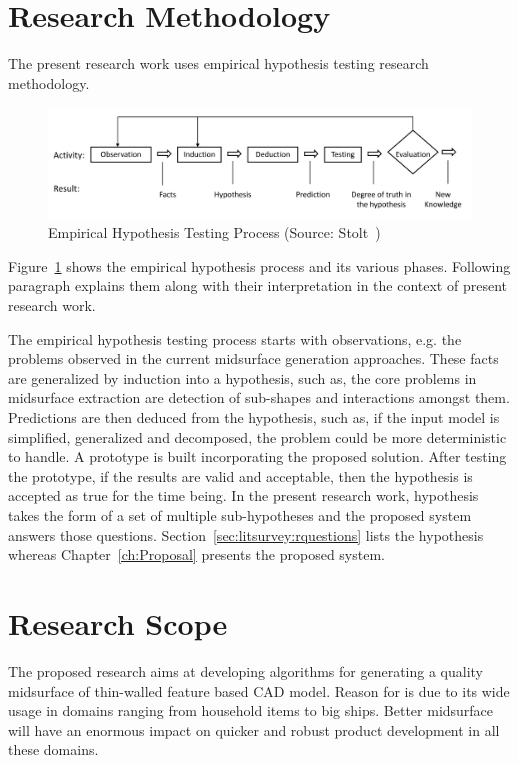 \section{Research Methodology} \label{sec:introduction:rm}
The present research work uses empirical hypothesis testing research methodology. 


	\begin{figure} [!h]
		\centering
		\includegraphics[width=0.9\linewidth]{images/ResearchMethodology.png}
		\caption{Empirical Hypothesis Testing Process (Source: Stolt~\cite{Stolt2008})}
		\label{fig:introduction:ResearchMethodology}
	\end{figure}

	
Figure~\ref{fig:introduction:ResearchMethodology} shows the empirical hypothesis process and its various phases. Following paragraph explains them along with their interpretation in the context of present research work. 

The empirical hypothesis testing process starts with observations, e.g. the problems observed in the current midsurface generation approaches. These facts are generalized by induction into a hypothesis, such as, the core problems in midsurface extraction are detection of sub-shapes and interactions amongst them. Predictions are then deduced from the hypothesis, such as, if the input model is simplified, generalized and decomposed, the problem could be more deterministic to handle.  A prototype is built incorporating the proposed solution. After testing the prototype, if the results are valid and acceptable, then the hypothesis is accepted as true for the time being. In the present research work, hypothesis takes the form of a set of multiple sub-hypotheses and the proposed system answers those questions. Section~\ref{sec:litsurvey:rquestions} lists the hypothesis whereas Chapter~\ref{ch:Proposal} presents the proposed system.

 \section{Research Scope}
The proposed research aims at developing algorithms for generating a quality midsurface of thin-walled  feature based CAD model.  Reason for  is due to its wide usage in domains ranging from household items to big ships.  Better midsurface will have an enormous impact on quicker and robust product development in all these domains.

